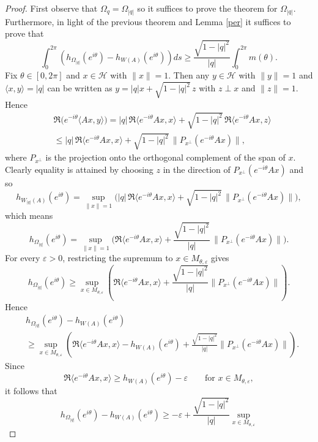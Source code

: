 \documentclass[10pt,a4paper]{amsart}
\begin{document}
\begin{proof}
First observe that $\Omega_q = \Omega_{|q|}$ so it suffices to prove the theorem for $\Omega_{|q|}$. Furthermore, in light of the previous theorem and Lemma \ref{per} it suffices to prove that 
$$
\int_0^{2 \pi} \left( h_{\Omega_{|q|}}(e^{ i \theta}) - h_{W(A)}(e^{ i \theta}) \right) ds   \geq \frac{\sqrt{1-|q|^2}}{|q|} \int_0^{2 \pi} m(\theta).
$$
Fix $\theta\in[0,2\pi]$ and $x \in \mathcal{H}$ with $\|x\|=1$. Then any $ y \in \mathcal{H}$ with $\|y\|=1$ and $\langle x,y\rangle=|q|$ can be written as
$y=|q|x+\sqrt{1-|q|^2}\,z$ with $z\perp x$ and $\|z\|=1$. Hence
\begin{align}
    &\Re\big(e^{-i\theta}\langle Ax,y\rangle\big)
= |q|\,\Re\langle e^{-i \theta}A x,x\rangle
+\sqrt{1-|q|^2}\,\Re\langle e^{-i \theta}A x,z\rangle \\
& \le |q|\,\Re\langle e^{-i \theta}A x,x\rangle + \sqrt{1-|q|^2}\,\|P_{x^\perp}(e^{-i \theta}A x)\|,
\end{align}
where $P_{x^\perp}$ is the projection onto the orthogonal complement of the span of $x$. Clearly equality is attained by choosing $z$ in the direction of $P_{x^\perp}(e^{-i \theta}A x)$ and so
\[
h_{W_{|q|}(A)}(e^{i\theta})
=\sup_{\|x\|=1}\Big(|q|\,\Re\langle e^{-i \theta}A x,x\rangle+\sqrt{1-|q|^2}\,\|P_{x^\perp}(e^{-i \theta}A x)\|\Big),
\]
which means
\begin{equation}\label{star1}
    h_{\Omega_{|q|}}(e^{i\theta})
=\sup_{\|x\|=1}\Big(\Re\langle e^{-i \theta}A x,x\rangle+\frac{\sqrt{1-|q|^2}}{|q|}\,\|P_{x^\perp}(e^{-i \theta}A x)\|\Big).
\end{equation}
For every $\varepsilon>0$, restricting the supremum to $x\in M_{\theta,\varepsilon}$ gives
\[
h_{\Omega_{|q|}}(e^{i\theta})
\ge
\sup_{x\in M_{\theta,\varepsilon}}
\left(
\Re\langle e^{-i\theta}Ax,x\rangle
+
\frac{\sqrt{1-|q|^2}}{|q|}
\|P_{x^\perp}(e^{-i\theta}Ax)\|
\right).
\]
Hence
\begin{align}
    &h_{\Omega_{|q|}}(e^{i\theta})-h_{W(A)}(e^{i\theta}) \\
&\ge
\sup_{x\in M_{\theta,\varepsilon}}
\left(
\Re\langle e^{-i\theta}Ax,x\rangle-h_{W(A)}(e^{i\theta})
+
\frac{\sqrt{1-|q|^2}}{|q|}
\|P_{x^\perp}(e^{-i\theta}Ax)\|
\right).
\end{align}
Since
\[
\Re\langle e^{-i\theta}Ax,x\rangle \ge h_{W(A)}(e^{i\theta})-\varepsilon
\qquad \text{for } x\in M_{\theta,\varepsilon},
\]
it follows that
\[
h_{\Omega_{|q|}}(e^{i\theta})-h_{W(A)}(e^{i\theta})
\ge
-\varepsilon+
\frac{\sqrt{1-|q|^2}}{|q|}
\sup_{x\in M_{\theta,\varepsilon}}
\]
\end{proof}
\end{document}
